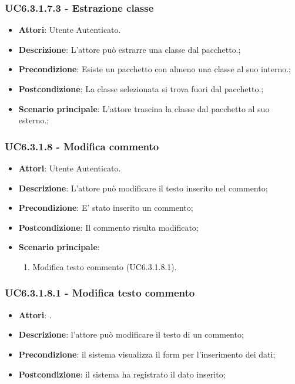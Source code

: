 \subsubsection{UC6.3.1.7.3 - Estrazione classe} 
\label{sssec:UC6.3.1.7.3} 
\begin{itemize} 
\item \textbf{Attori}: Utente Autenticato.
\item \textbf{Descrizione}: L'attore può estrarre una classe dal pacchetto.;
\item \textbf{Precondizione}: Esiste un pacchetto con almeno una classe al suo interno.;
\item \textbf{Postcondizione}: La classe selezionata si trova fuori dal pacchetto.;
\item \textbf{Scenario principale}: L'attore trascina la classe dal pacchetto al suo esterno.;\end{itemize} 
\subsubsection{UC6.3.1.8 - Modifica commento} 
\label{sssec:UC6.3.1.8} 
\begin{itemize} 
\item \textbf{Attori}: Utente Autenticato.
\item \textbf{Descrizione}: L'attore può modificare il testo inserito nel commento;
\item \textbf{Precondizione}: E' stato inserito un commento;
\item \textbf{Postcondizione}: Il commento risulta modificato;
\item \textbf{Scenario principale}: \begin{enumerate}\item Modifica testo commento (UC6.3.1.8.1). 
 \end{enumerate}
\end{itemize} 
\subsubsection{UC6.3.1.8.1 - Modifica testo commento} 
\label{sssec:UC6.3.1.8.1} 
\begin{itemize} 
\item \textbf{Attori}: .
\item \textbf{Descrizione}: l'attore può modificare il testo di un commento;
\item \textbf{Precondizione}: il sistema visualizza il form per l'inserimento dei dati;
\item \textbf{Postcondizione}: il sistema ha registrato il dato inserito;
\end{itemize} 
